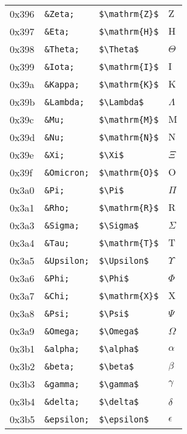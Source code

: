 \documentclass[a4paper,11pt]{article}
\begin{document}
{\begin{xtabular}{|l||l|l|l|}
0x396&\texttt{\&Zeta;}&\texttt{\$\textbackslash mathrm\{Z\}\$}&$\mathrm{Z}$\\ 
0x397&\texttt{\&Eta;}&\texttt{\$\textbackslash mathrm\{H\}\$}&$\mathrm{H}$\\ 
0x398&\texttt{\&Theta;}&\texttt{\$\textbackslash Theta\$}&$\Theta$\\ 
0x399&\texttt{\&Iota;}&\texttt{\$\textbackslash mathrm\{I\}\$}&$\mathrm{I}$\\ 
0x39a&\texttt{\&Kappa;}&\texttt{\$\textbackslash mathrm\{K\}\$}&$\mathrm{K}$\\ 
0x39b&\texttt{\&Lambda;}&\texttt{\$\textbackslash Lambda\$}&$\Lambda$\\ 
0x39c&\texttt{\&Mu;}&\texttt{\$\textbackslash mathrm\{M\}\$}&$\mathrm{M}$\\ 
0x39d&\texttt{\&Nu;}&\texttt{\$\textbackslash mathrm\{N\}\$}&$\mathrm{N}$\\ 
0x39e&\texttt{\&Xi;}&\texttt{\$\textbackslash Xi\$}&$\Xi$\\ 
0x39f&\texttt{\&Omicron;}&\texttt{\$\textbackslash mathrm\{O\}\$}&$\mathrm{O}$\\ 
0x3a0&\texttt{\&Pi;}&\texttt{\$\textbackslash Pi\$}&$\Pi$\\ 
0x3a1&\texttt{\&Rho;}&\texttt{\$\textbackslash mathrm\{R\}\$}&$\mathrm{R}$\\ 
0x3a3&\texttt{\&Sigma;}&\texttt{\$\textbackslash Sigma\$}&$\Sigma$\\ 
0x3a4&\texttt{\&Tau;}&\texttt{\$\textbackslash mathrm\{T\}\$}&$\mathrm{T}$\\ 
0x3a5&\texttt{\&Upsilon;}&\texttt{\$\textbackslash Upsilon\$}&$\Upsilon$\\ 
0x3a6&\texttt{\&Phi;}&\texttt{\$\textbackslash Phi\$}&$\Phi$\\ 
0x3a7&\texttt{\&Chi;}&\texttt{\$\textbackslash mathrm\{X\}\$}&$\mathrm{X}$\\ 
0x3a8&\texttt{\&Psi;}&\texttt{\$\textbackslash Psi\$}&$\Psi$\\ 
0x3a9&\texttt{\&Omega;}&\texttt{\$\textbackslash Omega\$}&$\Omega$\\ 
0x3b1&\texttt{\&alpha;}&\texttt{\$\textbackslash alpha\$}&$\alpha$\\ 
0x3b2&\texttt{\&beta;}&\texttt{\$\textbackslash beta\$}&$\beta$\\ 
0x3b3&\texttt{\&gamma;}&\texttt{\$\textbackslash gamma\$}&$\gamma$\\ 
0x3b4&\texttt{\&delta;}&\texttt{\$\textbackslash delta\$}&$\delta$\\ 
0x3b5&\texttt{\&epsilon;}&\texttt{\$\textbackslash epsilon\$}&$\epsilon$\\ 

\end{xtabular}}
\end{document}

